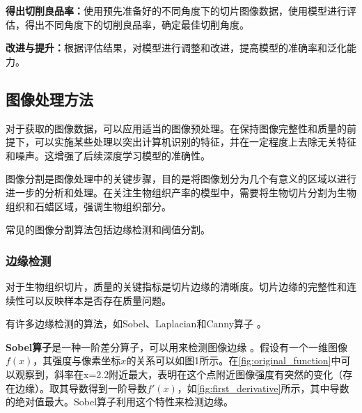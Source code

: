 \textbf{得出切削良品率：}使用预先准备好的不同角度下的切片图像数据，使用模型进行评估，得出不同角度下的切削良品率，确定最佳切削角度。

\textbf{改进与提升：}根据评估结果，对模型进行调整和改进，提高模型的准确率和泛化能力。

\subsection{图像处理方法}

对于获取的图像数据，可以应用适当的图像预处理。在保持图像完整性和质量的前提下，可以实施某些处理以突出计算机识别的特征，并在一定程度上去除无关特征和噪声。这增强了后续深度学习模型的准确性。

图像分割是图像处理中的关键步骤，目的是将图像划分为几个有意义的区域以进行进一步的分析和处理。在关注生物组织产率的模型中，需要将生物切片分割为生物组织和石蜡区域，强调生物组织部分。

常见的图像分割算法包括边缘检测和阈值分割。

\subsubsection{边缘检测}
对于生物组织切片，质量的关键指标是切片边缘的清晰度。切片边缘的完整性和连续性可以反映样本是否存在质量问题。

有许多边缘检测的算法，如Sobel、Laplacian和Canny算子 \cite{3.1}。

\textbf{Sobel算子}是一种一阶差分算子，可以用来检测图像边缘 \cite{补充1}。假设有一个一维图像$f(x)$，其强度与像素坐标$x$的关系可以如图1所示。在\autoref{fig:original_function}中可以观察到，斜率在x=2.2附近最大，表明在这个点附近图像强度有突然的变化（存在边缘）。取其导数得到一阶导数$f'(x)$，如\autoref{fig:first_derivative}所示，其中导数的绝对值最大。Sobel算子利用这个特性来检测边缘。

